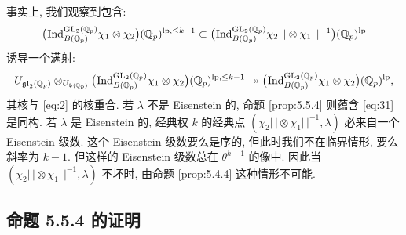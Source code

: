 事实上, 我们观察到包含:
\[
\bigl(\prescript{}{}{\mathrm{Ind}}_{B(\mathbb{Q}_p)}^{\mathrm{GL}_2(\mathbb{Q}_p)} \chi_1 \otimes \chi_2\bigr)(\mathbb{Q}_p)^{\mathrm{lp},\le k-1} \subset \bigl(\prescript{}{}{\mathrm{Ind}}_{B(\mathbb{Q}_p)}^{\mathrm{GL}_2(\mathbb{Q}_p)} \chi_2|\,| \otimes \chi_1|\,|^{-1}\bigr)(\mathbb{Q}_p)^{\mathrm{lp}}
\]
诱导一个满射:
\[
U_{\mathfrak{gl}_2(\mathbb{Q}_p)} \otimes_{U_{\mathfrak{b}(\mathbb{Q}_p)}} \bigl(\prescript{}{}{\mathrm{Ind}}_{B(\mathbb{Q}_p)}^{\mathrm{GL}_2(\mathbb{Q}_p)} \chi_1 \otimes \chi_2\bigr)(\mathbb{Q}_p)^{\mathrm{lp},\le k-1} \twoheadrightarrow \bigl(\prescript{}{}{\mathrm{Ind}}_{B(\mathbb{Q}_p)}^{\mathrm{GL}_2(\mathbb{Q}_p)} \chi_1 \otimes \chi_2\bigr)(\mathbb{Q}_p)^{\mathrm{lp}},
\]
其核与 \eqref{eq:2} 的核重合.
若 $\lambda$ 不是 Eisenstein 的, 命题 \ref{prop:5.5.4} 则蕴含 \eqref{eq:31} 是同构.
若 $\lambda$ 是 Eisenstein 的, 经典权 $k$ 的经典点 $(\chi_2|\,| \otimes \chi_1|\,|^{-1},\lambda)$ 必来自一个 Eisenstein 级数.
这个 Eisenstein 级数要么是序的, 但此时我们不在临界情形, 要么斜率为 $k-1$.
但这样的 Eisenstein 级数总在 $\theta^{k-1}$ 的像中.
因此当 $(\chi_2|\,| \otimes \chi_1|\,|^{-1},\lambda)$ 不坏时, 由命题 \ref{prop:5.4.4} 这种情形不可能.

\subsection{命题 5.5.4 的证明}\label{sec:5.6}

